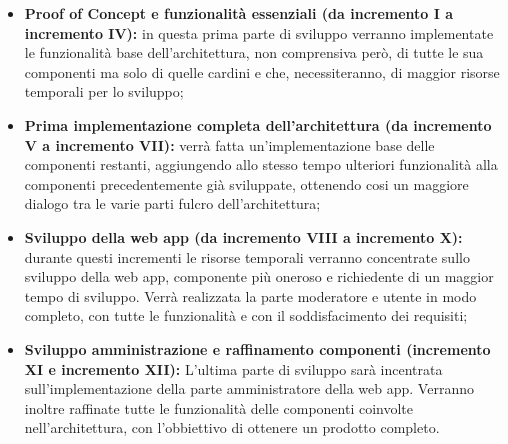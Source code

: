 \begin{itemize}
	\item \textbf{Proof of Concept e funzionalità essenziali (da incremento I a incremento IV):} in questa prima parte di sviluppo verranno implementate le funzionalità base dell'architettura, non comprensiva però, di tutte le sua componenti ma solo di quelle cardini e che, necessiteranno, di maggior risorse temporali per lo sviluppo;
	\item \textbf{Prima implementazione completa dell'architettura (da incremento V a incremento VII):} verrà fatta un'implementazione base delle componenti restanti, aggiungendo allo stesso tempo ulteriori funzionalità alla componenti precedentemente già sviluppate, ottenendo cosi un maggiore dialogo tra le varie parti fulcro dell'architettura;
	\item \textbf{Sviluppo della web app (da incremento VIII a incremento X):} durante questi incrementi le risorse temporali verranno concentrate sullo sviluppo della web app, componente più oneroso e richiedente di un maggior tempo di sviluppo. Verrà realizzata la parte moderatore e utente in modo completo, con tutte le funzionalità e con il soddisfacimento dei requisiti;
	\pagebreak
	\item \textbf{Sviluppo amministrazione e raffinamento componenti (incremento XI e incremento XII):} L'ultima parte di sviluppo sarà incentrata sull'implementazione della parte amministratore della web app. Verranno inoltre raffinate tutte le funzionalità delle componenti coinvolte nell'architettura, con l'obbiettivo di ottenere un prodotto completo.
	
\end{itemize}
